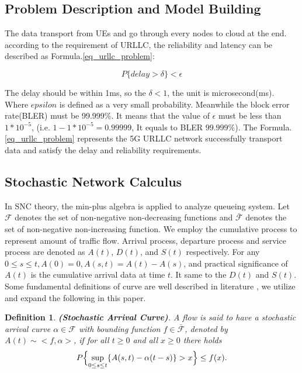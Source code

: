 \documentclass[conference]{IEEEtran}
\newtheorem{definition}{\textbf{Definition}}
\begin{document}
\subsection{Problem Description and Model Building}
The data transport from UEs and go through every nodes to cloud at the end.
according to the requirement of URLLC, the reliability and latency can be described as Formula.\ref{eq_urllc_problem}:

\begin{equation}\label{eq_urllc_problem}
P\{delay > \delta \} < \epsilon
\end{equation}

The delay should be within 1ms, so the $\delta < 1$, the unit is microsecond(ms). Where $epsilon$ is defined as a very small probability. Meanwhile the block error rate(BLER) must be 99.999\%. It means that the value of $\epsilon$ must be less than $1*10^{-5}$, (i.e. $1 - 1*10^{-5} = 0.99999$, It equals to BLER $99.999\%$). The Formula.\ref{eq_urllc_problem} represents the 5G URLLC network successfully transport data and satisfy the delay and reliability requirements.

\subsection{Stochastic Network Calculus}
In SNC theory, the min-plus algebra is applied to analyze queueing system. Let $\mathcal{F}$ denotes the set of non-negative non-decreasing functions and $\mathcal{\bar{F}}$ denotes the set of non-negative non-increasing function. We employ the cumulative process to represent amount of traffic flow. Arrival process, departure process and service process are denoted as $A(t)$, $D(t)$, and $S(t)$ respectively. For any $0 \leqslant s \leqslant t, A(0)=0, A(s,t) = A(t) - A(s)$, and practical significance of $A(t)$ is the cumulative arrival data at time $t$. It same to the $D(t)$ and $S(t)$. Some fundamental definitions of curve are well described in literature \cite{b4}, we utilize and expand the following in this paper.

\begin{definition}\label{def_SAC}
{\bfseries (Stochastic Arrival Curve)}. A flow is said to have a stochastic arrival curve $\alpha\in\mathcal{F}$ with bounding function $f\in\mathcal{\bar{F}}$, denoted by $A(t) \sim <f,\alpha>$, if for all $t \geq 0$ and all $x\geq0$ there holds
\begin{equation}\label{eq_sac}
P\Bigl\{\sup_{0\leq s \leq t}\{A(s,t) - \alpha(t-s)\} > x \Bigr\} \leq f(x).
\end{equation}
\end{definition}
\end{document}
